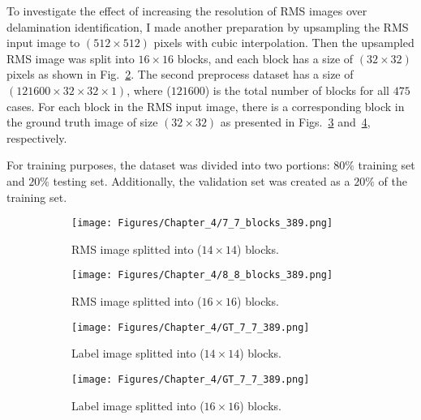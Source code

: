 To investigate the effect of increasing the resolution of RMS images over delamination identification, I made another preparation by upsampling the RMS input image to \((512\times 512)\) pixels with cubic interpolation. Then the upsampled RMS image was split into \(16\times 16\) blocks, and each block has a size of \((32\times 32)\) pixels as shown in Fig.~\ref{fig:RMS_64blocks}.
The second preprocess dataset has a size of \((121600 \times 32 \times 32 \times 1)\), where (\(121600\)) is the total number of blocks for all \(475\) cases.
For each block in the RMS input image, there is a corresponding block in the ground truth image of size \((32\times 32)\) as presented in Figs.~\ref{fig:GT_49blocks} and~\ref{fig:GT_64blocks}, respectively.

For training purposes, the dataset was divided into two portions: \(80\%\)	training set and \(20\%\) testing set. 
Additionally, the validation set was created as a \(20\%\) of the training set.
\begin{figure} [h!]
	\centering
	\begin{subfigure}[b]{0.47\textwidth}
		\centering
		\texttt{[image: Figures/Chapter\_4/7\_7\_blocks\_389.png]}
		\caption{RMS image splitted into (\(14\times 14\)) blocks.}
		\label{fig:RMS_49blocks}
	\end{subfigure}
	\hfill
	\begin{subfigure}[b]{0.47\textwidth}
		\centering
		\texttt{[image: Figures/Chapter\_4/8\_8\_blocks\_389.png]}
		\caption{RMS image splitted into (\(16\times 16\)) blocks.}
		\label{fig:RMS_64blocks}
	\end{subfigure}
	\hfill
	\begin{subfigure}[b]{0.47\textwidth}
		\centering
		\texttt{[image: Figures/Chapter\_4/GT\_7\_7\_389.png]}
		\caption{Label image splitted into (\(14\times 14\)) blocks.}
		\label{fig:GT_49blocks}
	\end{subfigure}
	\hfill
	\begin{subfigure}[b]{0.47\textwidth}
		\centering
		\texttt{[image: Figures/Chapter\_4/GT\_7\_7\_389.png]}
		\caption{Label image splitted into (\(16\times 16\)) blocks.}
		\label{fig:GT_64blocks}
	\end{subfigure}
	\caption{}
	\label{fig:grid_mesh}
\end{figure}

